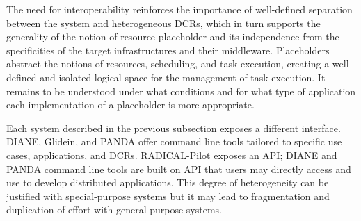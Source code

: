 \documentclass{sig-alternate}
\begin{document}
The need for interoperability reinforces the importance of well-defined
separation between the \pilot system and heterogeneous DCRs,   
which in turn supports the generality of the notion of resource placeholder and
its independence from the specificities of the target infrastructures and their
middleware. Placeholders abstract the notions of resources, scheduling, and task
execution, creating a well-defined and isolated logical space for the management
of task execution.  It remains to be understood under what conditions and for
what type of application each implementation of a placeholder is more
appropriate.











Each \pilot system described in the previous subsection exposes a different
interface.  DIANE, Glidein, and PANDA offer command
line tools tailored
to specific use cases, applications, and DCRs. RADICAL-Pilot exposes an API;
DIANE and PANDA command line tools are built on API that users may directly
access and use to develop distributed applications. This degree of heterogeneity
can be justified with special-purpose \pilot systems but it may lead to
fragmentation and duplication of effort with general-purpose
systems. 
\end{document}
